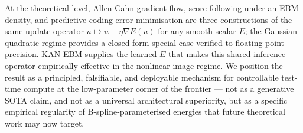 \documentclass{article}
\begin{document}
At the theoretical level, Allen-Cahn gradient flow, score following under an
EBM density, and predictive-coding error minimisation are three constructions
of the same update operator $u\!\mapsto\!u-\eta\nabla E(u)$ for any smooth
scalar $E$; the Gaussian quadratic regime provides a closed-form special case
verified to floating-point precision. KAN-EBM supplies the learned $E$ that
makes this shared inference operator empirically effective in the nonlinear
image regime. We position the result as a principled, falsifiable, and
deployable mechanism for controllable test-time compute at the low-parameter
corner of the frontier --- not as a generative SOTA claim, and not as a
universal architectural superiority, but as a specific empirical regularity
of B-spline-parameterised energies that future theoretical work may now
target.



\end{document}
